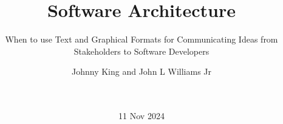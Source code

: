 \documentclass{acm_proc_article-sp}
\begin{document}
\title{Software Architecture}

\subtitle{When to use Text and Graphical Formats for Communicating Ideas from Stakeholders to Software Developers}


%
%
%
%
%

%
\author{
%
%
\alignauthor
Johnny King and John L Williams Jr\\
       \\
       \\
    }


\date{11 Nov 2024}
\end{document}
